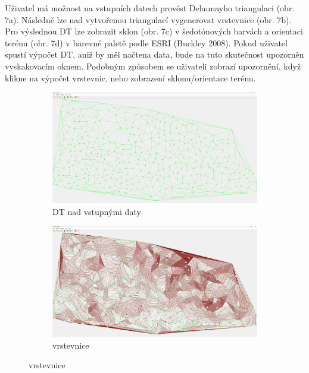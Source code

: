 \par Uživatel má možnost na vstupních datech provést Delaunayho triangulaci (obr. 7a). Následně lze nad vytvořenou triangulací vygenerovat vrstevnice (obr. 7b). Pro výslednou DT lze zobrazit sklon (obr. 7c) v šedotónových barvách a orientaci terénu (obr. 7d) v barevné paletě podle ESRI (Buckley 2008). Pokud uživatel spustí výpočet DT, aniž by měl načtena data, bude na tuto skutečnost upozorněn vyskakovacím oknem. Podobným způsobem se uživateli zobrazí upozornění, když klikne na výpočet vrstevnic, nebo zobrazení sklonu/orientace terénu.

\begin{figure}[H]

\begin{subfigure}{.475\linewidth}
  \includegraphics[width=\linewidth]{images/dtshowcase.png}
  \caption{DT nad vstupnými daty}
  \label{MLEDdet}
\end{subfigure}\hfill %
\begin{subfigure}{.475\linewidth}
  \includegraphics[width=\linewidth]{images/contourshowcase.png}
  \caption{vrstevnice}
  \label{energydetPSK}
\end{subfigure}


\end{figure}
